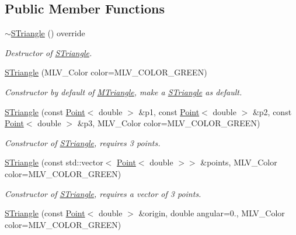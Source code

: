 \subsection*{Public Member Functions}
\begin{DoxyCompactItemize}
\item 
\mbox{\label{classSTriangle_ad278fb75870a545bcb6617058c77d73f}} 
\hyperlink{classSTriangle_ad278fb75870a545bcb6617058c77d73f}{$\sim$\+S\+Triangle} () override
\begin{DoxyCompactList}\small\item\em Destructor of \hyperlink{classSTriangle}{S\+Triangle}. \end{DoxyCompactList}\item 
\hyperlink{classSTriangle_a56ad36f53fbb46fb05d57ca6e4a41f2a}{S\+Triangle} (M\+L\+V\+\_\+\+Color color=M\+L\+V\+\_\+\+C\+O\+L\+O\+R\+\_\+\+G\+R\+E\+EN)
\begin{DoxyCompactList}\small\item\em Constructor by default of \hyperlink{classMTriangle}{M\+Triangle}, make a \hyperlink{classSTriangle}{S\+Triangle} as default. \end{DoxyCompactList}\item 
\hyperlink{classSTriangle_a2f80f360d80efc87dfdbbdd555d1ecfe}{S\+Triangle} (const \hyperlink{classPoint}{Point}$<$ double $>$ \&p1, const \hyperlink{classPoint}{Point}$<$ double $>$ \&p2, const \hyperlink{classPoint}{Point}$<$ double $>$ \&p3, M\+L\+V\+\_\+\+Color color=M\+L\+V\+\_\+\+C\+O\+L\+O\+R\+\_\+\+G\+R\+E\+EN)
\begin{DoxyCompactList}\small\item\em Constructor of \hyperlink{classSTriangle}{S\+Triangle}, requires 3 points. \end{DoxyCompactList}\item 
\hyperlink{classSTriangle_ad22ceb26e87756cdbe432e8adf743b55}{S\+Triangle} (const std\+::vector$<$ \hyperlink{classPoint}{Point}$<$ double $>$$>$ \&points, M\+L\+V\+\_\+\+Color color=M\+L\+V\+\_\+\+C\+O\+L\+O\+R\+\_\+\+G\+R\+E\+EN)
\begin{DoxyCompactList}\small\item\em Constructor of \hyperlink{classSTriangle}{S\+Triangle}, requires a vector of 3 points. \end{DoxyCompactList}\item 
\hyperlink{classSTriangle_af5129d1631bf4d546921c7e3758fe905}{S\+Triangle} (const \hyperlink{classPoint}{Point}$<$ double $>$ \&origin, double angular=0., M\+L\+V\+\_\+\+Color color=M\+L\+V\+\_\+\+C\+O\+L\+O\+R\+\_\+\+G\+R\+E\+EN)
$$
\end{DoxyCompactItemize}
